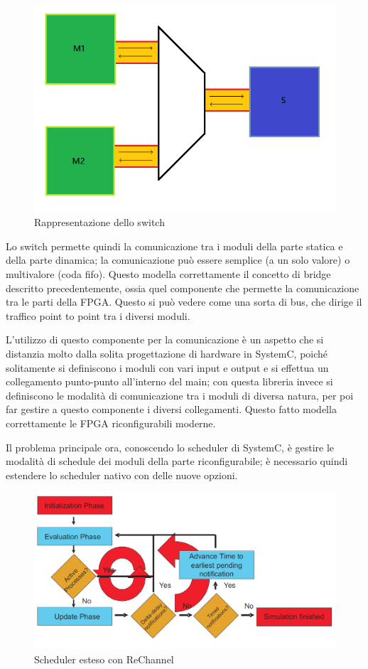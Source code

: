 \documentclass[11pt]{article} %
\begin{document}
\begin{figure}[ht]
\centering
\includegraphics[scale=0.5]{portal.png}
\caption{Rappresentazione dello switch}\label{fig:3}
\end{figure}

Lo switch permette quindi la comunicazione tra i moduli della parte statica e della parte dinamica; la comunicazione può essere semplice (a un solo valore) o multivalore (coda fifo). Questo modella correttamente il concetto di bridge descritto precedentemente, ossia quel componente che permette la comunicazione tra le parti della FPGA. Questo si può vedere come una sorta di bus, che dirige il traffico point to point tra i diversi moduli.

L'utilizzo di questo componente per la comunicazione è un aspetto che si distanzia molto dalla solita progettazione di hardware in SystemC, poiché solitamente si definiscono i moduli con vari input e output e si effettua un collegamento punto-punto all'interno del main; con questa libreria invece si definiscono le modalità di comunicazione tra i moduli di diversa natura, per poi far gestire a questo componente i diversi collegamenti. Questo fatto modella correttamente le FPGA riconfigurabili moderne.

Il problema principale ora, conoscendo lo scheduler di SystemC, è gestire le modalità di schedule dei moduli della parte riconfigurabile; è necessario quindi estendere lo scheduler nativo con delle nuove opzioni.

\begin{figure}[ht]
\centering
\includegraphics[scale=0.5]{scheduler_rechannel.png}
\caption{Scheduler esteso con ReChannel}\label{fig:4}
\end{figure}
\end{document}

